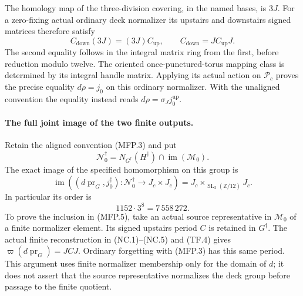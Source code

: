 The homology map of the three-division covering, in the named bases,
is $3J$.  For a zero-fixing actual ordinary deck normalizer its upstairs
and downstairs signed matrices therefore satisfy
\[
       C_{\mathrm{down}}(3J)=(3J)C_{\mathrm{up}},\qquad
       C_{\mathrm{down}}=JC_{\mathrm{up}}J.
                                                               \tag{MFP.4}
\]
The second equality follows in the integral matrix ring from the first,
before reduction modulo twelve.  The oriented once-punctured-torus
mapping class is determined by its integral handle matrix.  Applying
its actual action on $\mathcal P_c$ proves the precise equality
$d\rho=j_0$ on this ordinary normalizer.  With the unaligned convention
the equality instead reads $d\rho=\sigma_J j_0^{\mathrm{up}}$.

\paragraph{The full joint image of the two finite outputs.}
Retain the aligned convention (MFP.3) and put
\[
 \mathcal N_0^\dagger
   =N_{G^\dagger}(H^\dagger)\cap\operatorname{im}(\mathcal M_0).
\]
The exact image of the specified homomorphism on this group is
\[
 \operatorname{im}\!\left(
   (d\operatorname{pr}_G,j_0^\dagger):
   \mathcal N_0^\dagger\longrightarrow J_c\times J_c\right)
     =J_c\mathbin{\times}_{\operatorname{SL}_2(\mathbb Z/12)}J_c.
                                                               \tag{MFP.5}
\]
In particular its order is
\[
                  1152\cdot3^8=7\,558\,272.
                                                               \tag{MFP.6}
\]
To prove the inclusion in (MFP.5), take an actual source representative
in $\mathcal M_0$ of a finite normalizer element.  Its signed upstairs
period $C$ is retained in $G^\dagger$.  The actual finite reconstruction
in (NC.1)--(NC.5) and (TF.4) gives
$\varpi(d\operatorname{pr}_G)=JCJ$.  Ordinary forgetting with (MFP.3)
has this same period.  This argument uses finite normalizer membership
only for the domain of $d$; it does not assert that the source
representative normalizes the deck group before passage to the
finite quotient.

